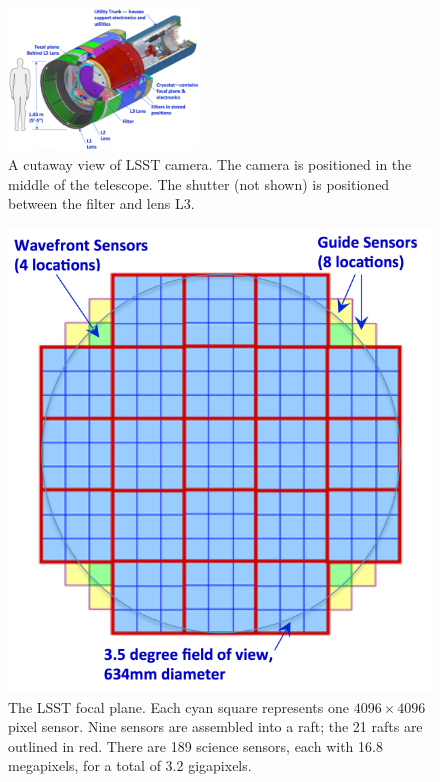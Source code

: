 \documentclass{emulateapj}
\begin{document}
\begin{figure}[t!]
\hskip 0.1in
\includegraphics[width=0.45\textwidth]{CameraFigureUpdated.pdf}
\caption{A cutaway view of LSST camera. The camera is positioned in the middle of the telescope.  The shutter (not shown) is positioned between the filter and lens L3.} 
\label{Fig:camera}
\end{figure}


\begin{figure}[ht]
\includegraphics[width=1.0\hsize,clip]{fov-updated-cropped.pdf}
\caption{The LSST focal plane. Each cyan square represents one
$4096\times4096$ pixel sensor. Nine sensors are assembled into a
raft; the 21 rafts are outlined in red. There are 189 science sensors, each 
with 16.8 megapixels, for a total of 3.2 gigapixels.} 
\label{Fig:fov}
\end{figure}
\end{document}
